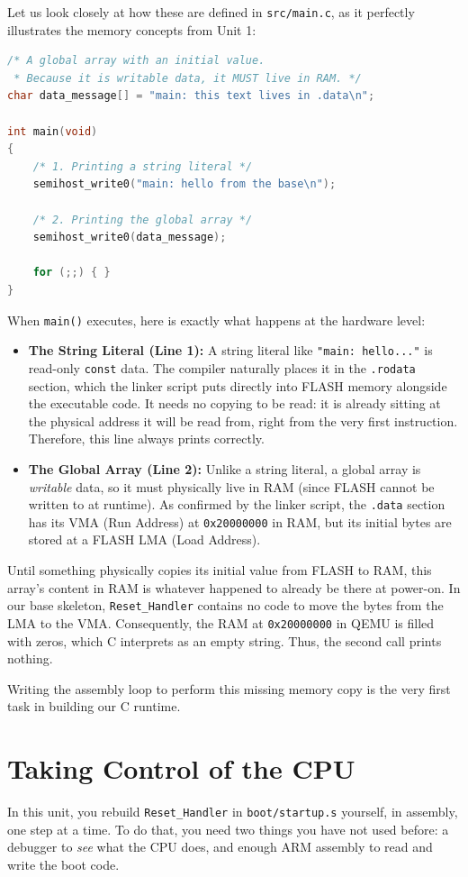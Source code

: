Let us look closely at how these are defined in \texttt{src/main.c}, as it perfectly illustrates the memory concepts from Unit 1:

\begin{lstlisting}[language=c]
/* A global array with an initial value. 
 * Because it is writable data, it MUST live in RAM. */
char data_message[] = "main: this text lives in .data\n";

int main(void)
{
    /* 1. Printing a string literal */
    semihost_write0("main: hello from the base\n");

    /* 2. Printing the global array */
    semihost_write0(data_message);

    for (;;) { }
}
\end{lstlisting}

When \texttt{main()} executes, here is exactly what happens at the hardware level:
\begin{itemize}
    \item \textbf{The String Literal (Line 1):} A string literal like \texttt{"main: hello..."} is read-only \texttt{const} data. The compiler naturally places it in the \texttt{.rodata} section, which the linker script puts directly into FLASH memory alongside the executable code. It needs no copying to be read: it is already sitting at the physical address it will be read from, right from the very first instruction. Therefore, this line always prints correctly.
    \item \textbf{The Global Array (Line 2):} Unlike a string literal, a global array is \textit{writable} data, so it must physically live in RAM (since FLASH cannot be written to at runtime). As confirmed by the linker script, the \texttt{.data} section has its VMA (Run Address) at \texttt{0x20000000} in RAM, but its initial bytes are stored at a FLASH LMA (Load Address). 
\end{itemize}

Until something physically copies its initial value from FLASH to RAM, this array's content in RAM is whatever happened to already be there at power-on. In our base skeleton, \texttt{Reset\_Handler} contains no code to move the bytes from the LMA to the VMA. Consequently, the RAM at \texttt{0x20000000} in QEMU is filled with zeros, which C interprets as an empty string. Thus, the second call prints nothing.

Writing the assembly loop to perform this missing memory copy is the very first task in building our C runtime.


\section{Taking Control of the CPU}
In this unit, you rebuild \texttt{Reset\_Handler} in \texttt{boot/startup.s} yourself, in assembly, one step at a time. To do that, you need two things you have not used before: a debugger to \textit{see} what the CPU does, and enough ARM assembly to read and write the boot code.

